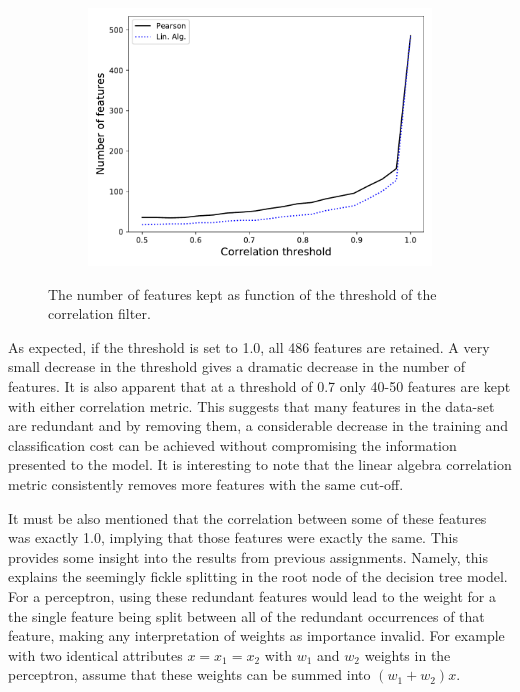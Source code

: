 \documentclass[paper=a4, fontsize=11pt]{scrartcl} %
\begin{document}
\begin{figure}[H]
	\centering
	\begin{subfigure}{0.7\linewidth}
		\centering
		\includegraphics[width=1.0\linewidth]{../output/features/figures/global_max_feature_correlation}
	\end{subfigure}
	\caption{The number of features kept as function of the threshold of  the correlation filter.}
	\label{fig:feature-correlation}
\end{figure}

As expected, if the threshold is set to 1.0, all 486 features are retained.
A very small decrease in the threshold gives a dramatic decrease in the number of features.
It is also apparent that at a threshold of 0.7 only 40-50 features are kept with either correlation metric.
This suggests that many features in the data-set are redundant and by removing them, a considerable decrease in the training and classification cost can be achieved without compromising the information presented to the model.
It is interesting to note that the linear algebra correlation metric consistently removes more features with the same cut-off.

It must be also mentioned that the correlation between some of these features was exactly 1.0, implying that those features were exactly the same.
This provides some insight into the results from previous assignments.
Namely, this explains the seemingly fickle splitting in the root node of the decision tree model.
For a perceptron, using these redundant features would lead to the weight for a the single feature being split between all of the redundant occurrences of that feature, making any interpretation of weights as importance invalid.
For example with two identical attributes $x=x_1=x_2$ with $w_1$ and $w_2$ weights in the perceptron, assume that these weights can be summed into $(w_1+w_2)x$.
\end{document}
